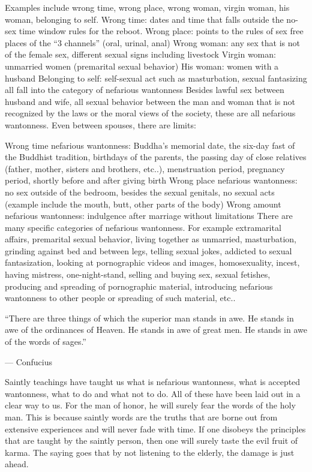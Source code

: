 \documentclass[
]{book}
\begin{document}
Examples include wrong time, wrong place, wrong woman, virgin woman, his woman, belonging to self.
Wrong time: dates and time that falls outside the no-sex time window rules for the reboot.
Wrong place: points to the rules of sex free places of the ``3 channels'' (oral, urinal, anal)
Wrong woman: any sex that is not of the female sex, different sexual signs including livestock
Virgin woman: unmarried women (premarital sexual behavior)
His woman: women with a husband
Belonging to self: self-sexual act such as masturbation, sexual fantasizing all fall into the category of nefarious wantonness
Besides lawful sex between husband and wife, all sexual behavior between the man and woman that is not recognized by the laws or the moral views of the society, these are all nefarious wantonness.
Even between spouses, there are limits:

Wrong time nefarious wantonness: Buddha's memorial date, the six-day fast of the Buddhist tradition, birthdays of the parents, the passing day of close relatives (father, mother, sisters and brothers, etc..), menstruation period, pregnancy period, shortly before and after giving birth
Wrong place nefarious wantonness: no sex outside of the bedroom, besides the sexual genitals, no sexual acts (example include the mouth, butt, other parts of the body)
Wrong amount nefarious wantonness: indulgence after marriage without limitations
There are many specific categories of nefarious wantonness. For example extramarital affairs, premarital sexual behavior, living together as unmarried, masturbation, grinding against bed and between legs, telling sexual jokes, addicted to sexual fantasization, looking at pornographic videos and images, homosexuality, incest, having mistress, one-night-stand, selling and buying sex, sexual fetishes, producing and spreading of pornographic material, introducing nefarious wantonness to other people or spreading of such material, etc..

``There are three things of which the superior man stands in awe. He stands in awe of the ordinances of Heaven. He stands in awe of great men. He stands in awe of the words of sages.''

--- Confucius

Saintly teachings have taught us what is nefarious wantonness, what is accepted wantonness, what to do and what not to do. All of these have been laid out in a clear way to us. For the man of honor, he will surely fear the words of the holy man. This is because saintly words are the truths that are borne out from extensive experiences and will never fade with time. If one disobeys the principles that are taught by the saintly person, then one will surely taste the evil fruit of karma. The saying goes that by not listening to the elderly, the damage is just ahead.
\end{document}
